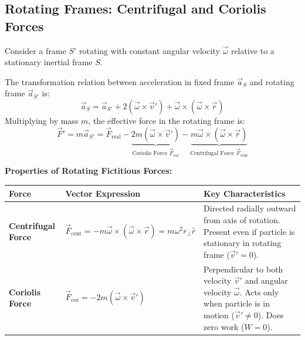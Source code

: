\documentclass[12pt,a4paper]{article}
\begin{document}
\subsection{Rotating Frames: Centrifugal and Coriolis Forces}

Consider a frame $S'$ rotating with constant angular velocity $\vec{\omega}$ relative to a stationary inertial frame $S$.

\begin{tcolorbox}[formulabox, title={\textbf{Transformation Equation for Acceleration}}]
The transformation relation between acceleration in fixed frame $\vec{a}_S$ and rotating frame $\vec{a}_{S'}$ is:
\begin{equation}
\vec{a}_S = \vec{a}_{S'} + 2(\vec{\omega} \times \vec{v}') + \vec{\omega} \times (\vec{\omega} \times \vec{r})
\end{equation}
Multiplying by mass $m$, the effective force in the rotating frame is:
\begin{equation}
\vec{F}' = m \vec{a}_{S'} = \vec{F}_{\text{real}} - \underbrace{2m(\vec{\omega} \times \vec{v}')}_{\text{Coriolis Force } \vec{F}_{\text{cor}}} - \underbrace{m\vec{\omega} \times (\vec{\omega} \times \vec{r})}_{\text{Centrifugal Force } \vec{F}_{\text{cent}}}
\end{equation}
\end{tcolorbox}

\textbf{Properties of Rotating Fictitious Forces:}\par\vspace{6pt}\noindent
\begin{tabularx}{\linewidth}{|B{3.2cm}|Y|Y|}
\hline
\textbf{Force} & \textbf{Vector Expression} & \textbf{Key Characteristics} \\
\hline
\textbf{Centrifugal Force} & $\vec{F}_{\text{cent}} = -m\vec{\omega} \times (\vec{\omega} \times \vec{r}) = m \omega^2 r_{\perp} \hat{r}$ & Directed radially outward from axis of rotation. Present even if particle is stationary in rotating frame ($\vec{v}' = 0$). \\
\hline
\textbf{Coriolis Force} & $\vec{F}_{\text{cor}} = -2m(\vec{\omega} \times \vec{v}')$ & Perpendicular to both velocity $\vec{v}'$ and angular velocity $\vec{\omega}$. Acts only when particle is in motion ($\vec{v}' \neq 0$). Does zero work ($W = 0$). \\
\hline
\end{tabularx}
\end{document}
